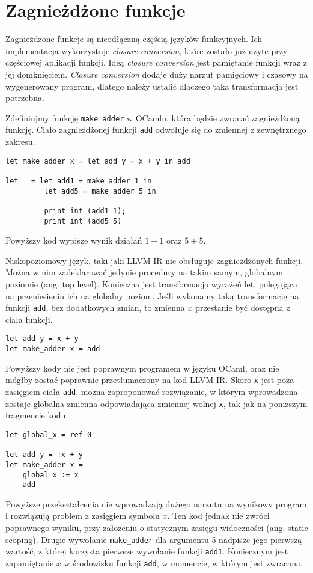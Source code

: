 \documentclass[declaration,shortabstract]{iithesis}
\begin{document}

\section{Zagnieżdżone funkcje}

Zagnieżdżone funkcje są nieodłączną częścią języków funkcyjnych. Ich implementacja wykorzystuje 
\textit{closure conversion}, które zostało już użyte przy częściowej aplikacji funkcji. 
Ideą \textit{closure conversion} jest pamiętanie funkcji wraz z jej domknięciem. 
\textit{Closure conversion} dodaje duży narzut pamięciowy i czasowy na wygenerowany program,
dlatego należy ustalić dlaczego taka transformacja jest potrzebna.

Zdefiniujmy funkcję \texttt{make\_adder} w OCamlu, która będzie zwracać 
zagnieżdżoną funkcję.
Ciało zagnieżdżonej funkcji \texttt{add} odwołuje się do zmiennej z 
zewnętrznego zakresu.
\begin{lstlisting}[frame=lines]
let make_adder x = let add y = x + y in add 
  
let _ = let add1 = make_adder 1 in 
         let add5 = make_adder 5 in 
     
         print_int (add1 1);
         print_int (add5 5) 
\end{lstlisting}
Powyższy kod wypisze wynik działań $1 + 1$ oraz $5 + 5$. 

Niskopoziomowy język, taki jaki LLVM IR nie obsługuje zagnieżdżonych 
funkcji. Można w
nim zadeklarować jedynie procedury na takim samym, globalnym poziomie (ang. 
top level). 
Konieczna jest transformacja wyrażeń let, polegająca na przeniesieniu 
ich na globalny poziom. 
Jeśli wykonamy taką transformację na funkcji \texttt{add}, bez dodatkowych 
zmian, to zmienna $x$
przestanie być dostępna z ciała funkcji.

\begin{lstlisting}[frame=lines]
let add y = x + y 
let make_adder x = add 
\end{lstlisting}
Powyższy kody nie jest poprawnym programem w języku OCaml, oraz 
nie mógłby zostać poprawnie przetłumaczony na kod LLVM IR. 
Skoro \texttt{x} jest poza zasięgiem ciała \texttt{add}, można zaproponować rozwiązanie,
w którym wprowadzona zostaje globalna zmienna odpowiadająca zmiennej wolnej 
\texttt{x}, tak jak na poniższym fragmencie kodu.

\begin{lstlisting}[frame=lines]
let global_x = ref 0

let add y = !x + y 
let make_adder x = 
    global_x := x
    add 
\end{lstlisting}
Powyższe przekształcenia nie wprowadzają dużego narzutu na wynikowy program i rozwiązują 
problem z zasięgiem symbolu $x$. Ten kod jednak nie zwróci poprawnego wyniku, 
przy założeniu o statycznym zasięgu widoczności (ang. static scoping). Drugie 
wywołanie \texttt{make\_adder} dla argumentu 5 nadpisze jego pierwszą wartość, 
z której korzysta pierwsze wywołanie funkcji \texttt{add1}. 
Koniecznym jest zapamiętanie $x$ w środowisku funkcji 
\texttt{add}, w momencie, w którym jest zwracana. 
\end{document}
